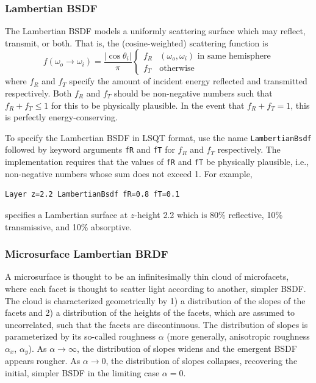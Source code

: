 \documentclass[
    twoside,
    twocolumn,
    letterpaper,
    10pt]{article}
\newcommand\namett[2]{{\color{code#1}\texttt{#2}}}
\begin{document}
\subsubsection{Lambertian BSDF}
\label{sec:doc-layers-lambertian}

The Lambertian BSDF models a uniformly scattering surface which 
may reflect, transmit, or both. That is, the (cosine-weighted)
scattering function is
\begin{equation*}
    f(\omega_o\to\omega_i) =
    \frac{|\cos{\theta_i}|}{\pi}
    \begin{cases}
        f_R & \text{$(\omega_o, \omega_i)$ in same hemisphere}\\
        f_T & \text{otherwise}
    \end{cases}
\end{equation*}
where $f_R$ and $f_T$ specify the amount of incident energy 
reflected and transmitted respectively. Both $f_R$ and $f_T$ should
be non-negative numbers such that $f_R + f_T \le 1$ for this to be
physically plausible. In the event that $f_R + f_T = 1$, this is
perfectly energy-conserving.

To specify the Lambertian BSDF in LSQT format, use the name
\namett{purple}{LambertianBsdf} followed by keyword arguments 
\texttt{fR} and \texttt{fT} for $f_R$ and $f_T$ respectively. The 
implementation requires that the values of \texttt{fR} and \texttt{fT} 
be physically plausible, i.e., non-negative numbers whose sum does not exceed 1.
For example,
\begin{lstlisting}
Layer z=2.2 LambertianBsdf fR=0.8 fT=0.1
\end{lstlisting}
specifies a Lambertian surface at $z$-height 2.2 which is 80\% reflective,
10\% transmissive, and 10\% absorptive. 

\subsubsection{Microsurface Lambertian BRDF}
\label{sec:doc-layers-microsurface-lambertian}

A microsurface is thought 
to be an infinitesimally thin cloud of microfacets, where each facet 
is thought to scatter light according to another, simpler BSDF. The 
cloud is characterized geometrically by 1) a distribution of the
slopes of the facets and 2) a distribution of the heights of the facets,
which are assumed to uncorrelated, such that the facets are discontinuous. 
The distribution of slopes is parameterized by its so-called roughness
$\alpha$ (more generally, anisotropic roughness $\alpha_x$, $\alpha_y$).
As $\alpha\to\infty$, the distribution of slopes widens and the emergent
BSDF appears rougher. As $\alpha\to0$, the distribution of slopes collapses,
recovering the initial, simpler BSDF in the limiting case $\alpha=0$.
\end{document}
